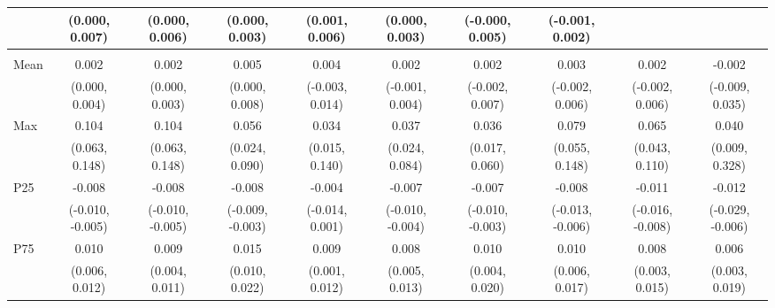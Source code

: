 {\begin{tabular}{l|c|c|c|c|c|c|c|c|c}
& {\scriptsize (0.000, 0.007)}
& {\scriptsize (0.000, 0.006)}
& {\scriptsize (0.000, 0.003)}
& {\scriptsize (0.001, 0.006)}
& {\scriptsize (0.000, 0.003)}
& {\scriptsize (-0.000, 0.005)}
& {\scriptsize (-0.001, 0.002)}
\\ [0.1cm]
\hline
\noalign{\smallskip}
\multicolumn{10}{l}{\textbf{Effect with Leads and Lags}} \\
\noalign{\smallskip}
\hline
Mean
& 0.002 & 0.002 & 0.005 & 0.004 & 0.002 & 0.002 & 0.003 & 0.002 & -0.002 \\
& {\scriptsize (0.000, 0.004)}
& {\scriptsize (0.000, 0.003)}
& {\scriptsize (0.000, 0.008)}
& {\scriptsize (-0.003, 0.014)}
& {\scriptsize (-0.001, 0.004)}
& {\scriptsize (-0.002, 0.007)}
& {\scriptsize (-0.002, 0.006)}
& {\scriptsize (-0.002, 0.006)}
& {\scriptsize (-0.009, 0.035)}
\\ [0.1cm]
\hline
Max
& 0.104 & 0.104 & 0.056 & 0.034 & 0.037 & 0.036 & 0.079 & 0.065 & 0.040 \\
& {\scriptsize (0.063, 0.148)}
& {\scriptsize (0.063, 0.148)}
& {\scriptsize (0.024, 0.090)}
& {\scriptsize (0.015, 0.140)}
& {\scriptsize (0.024, 0.084)}
& {\scriptsize (0.017, 0.060)}
& {\scriptsize (0.055, 0.148)}
& {\scriptsize (0.043, 0.110)}
& {\scriptsize (0.009, 0.328)}
\\ [0.1cm]
\hline
P25
& -0.008 & -0.008 & -0.008 & -0.004 & -0.007 & -0.007 & -0.008 & -0.011 & -0.012 \\
& {\scriptsize (-0.010, -0.005)}
& {\scriptsize (-0.010, -0.005)}
& {\scriptsize (-0.009, -0.003)}
& {\scriptsize (-0.014, 0.001)}
& {\scriptsize (-0.010, -0.004)}
& {\scriptsize (-0.010, -0.003)}
& {\scriptsize (-0.013, -0.006)}
& {\scriptsize (-0.016, -0.008)}
& {\scriptsize (-0.029, -0.006)}
\\ [0.1cm]
\hline
P75
& 0.010 & 0.009 & 0.015 & 0.009 & 0.008 & 0.010 & 0.010 & 0.008 & 0.006 \\
& {\scriptsize (0.006, 0.012)}
& {\scriptsize (0.004, 0.011)}
& {\scriptsize (0.010, 0.022)}
& {\scriptsize (0.001, 0.012)}
& {\scriptsize (0.005, 0.013)}
& {\scriptsize (0.004, 0.020)}
& {\scriptsize (0.006, 0.017)}
& {\scriptsize (0.003, 0.015)}
& {\scriptsize (0.003, 0.019)}
\\ [0.1cm]
\hline
\hline
\end{tabular}
}
